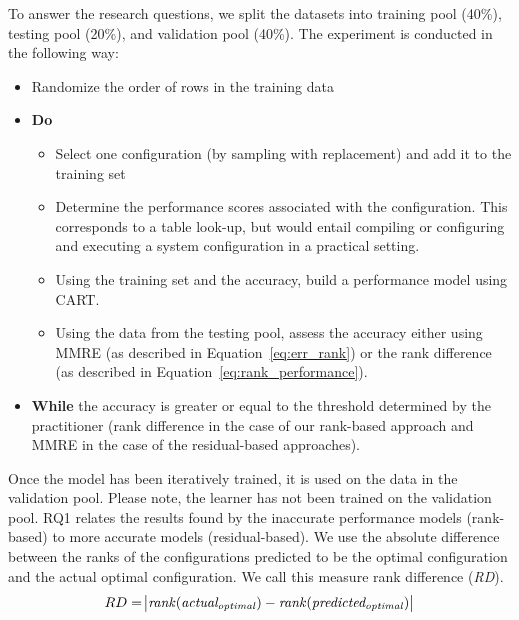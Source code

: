 To answer the research questions, we split the datasets into training pool (40\%), testing pool (20\%), and validation pool (40\%). The experiment is conducted in the following way:
\begin{itemize}
    \item Randomize the order of rows  in  the training data
    \item \textbf{Do}
    \begin{itemize}
        \item Select one configuration (by sampling with replacement) and add it to the training set
        \item Determine the performance scores associated with the configuration. This corresponds to  a table look-up, but would entail compiling or configuring and executing a system configuration in a practical setting.
        \item Using the training set and the accuracy, build a performance model using CART.
        \item Using the data from the testing pool, assess the accuracy either using MMRE (as described in Equation~\ref{eq:err_rank}) or the rank difference (as described in Equation~\ref{eq:rank_performance}).         
    \end{itemize}
    \item \textbf{While} the accuracy is greater or equal to the threshold determined by the practitioner (rank difference in the case of our rank-based approach and MMRE in the case of the residual-based approaches).
\end{itemize}

Once the model has been iteratively trained, it is used on the data in the validation pool. Please note, the learner has not been trained on the validation pool.
RQ1 relates the results found by the inaccurate performance models (rank-based) to more accurate models (residual-based). We use the absolute difference between the ranks of the configurations predicted to be the optimal configuration and the actual optimal configuration. We call this measure rank difference (\textit{RD}).  
\begin{equation}\label{eq:rankdiff}
    \begin{split}
        RD &= \abs{\mathit{rank(actual_{optimal})} - \mathit{rank(predicted_{optimal})}}\\
    \end{split}
\end{equation}



